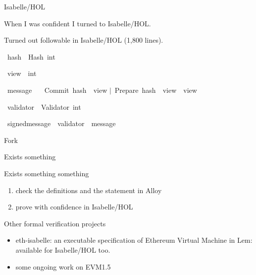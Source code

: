 \documentclass{beamer}
\begin{document}
\begin{frame}{Isabelle/HOL}

When I was confident I turned to Isabelle/HOL.

\vfill

\alert{Turned out followable in Isabelle/HOL (1,800 lines).}
\end{frame}

\begin{frame}
\renewcommand\isacharbar{$\mid$}

\isamarkupfalse%
\ hash\ {\isacharequal}\ Hash\ int%

\isamarkupfalse%
\ view\ {\isacharequal}\ int%

\isamarkupfalse%
\ message\ {\isacharequal}\isanewline
\ \ Commit\ {\isachardoublequoteopen}hash\ {\isacharasterisk}\ view{\isachardoublequoteclose}\isanewline
{\isacharbar}\ Prepare\ {\isachardoublequoteopen}hash\ {\isacharasterisk}\ view\ {\isacharasterisk}\ view{\isachardoublequoteclose}%

\isamarkupfalse%
\ validator\ {\isacharequal}\ Validator\ int%

\isamarkupfalse%
\ signed{\isacharunderscore}message\ {\isacharequal}\ {\isachardoublequoteopen}validator\ {\isacharasterisk}\ message{\isachardoublequoteclose}%
\end{frame}

\begin{frame}{Fork}
\end{frame}

\begin{frame}{Exists something}
\end{frame}

\begin{frame}{Exists something something}
\end{frame}

\begin{frame}
\begin{enumerate}
\item check the definitions and the statement in Alloy
\item prove with confidence in Isabelle/HOL
\end{enumerate}
\end{frame}


\begin{frame}{Other formal verification projects}

\begin{itemize}
\item eth-isabelle: an executable specification of Ethereum Virtual Machine in Lem: available for Isabelle/HOL too.
\item some ongoing work on EVM1.5
\end{itemize}
\end{frame}
\end{document}
